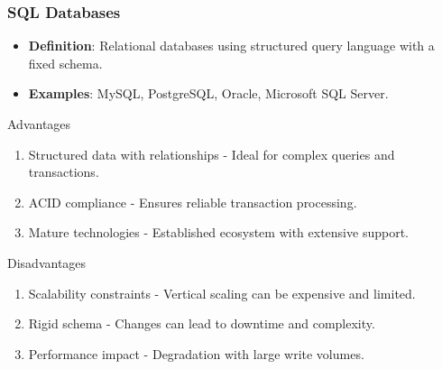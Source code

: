 \documentclass[aspectratio=169]{beamer}
\begin{document}
\begin{frame}[fragile]
    \frametitle{SQL Databases}
    \begin{itemize}
        \item \textbf{Definition}: Relational databases using structured query language with a fixed schema.
        \item \textbf{Examples}: MySQL, PostgreSQL, Oracle, Microsoft SQL Server.
    \end{itemize}

    \begin{block}{Advantages}
        \begin{enumerate}
            \item Structured data with relationships - Ideal for complex queries and transactions.
            \item ACID compliance - Ensures reliable transaction processing.
            \item Mature technologies - Established ecosystem with extensive support.
        \end{enumerate}
    \end{block}

    \begin{block}{Disadvantages}
        \begin{enumerate}
            \item Scalability constraints - Vertical scaling can be expensive and limited.
            \item Rigid schema - Changes can lead to downtime and complexity.
            \item Performance impact - Degradation with large write volumes.
        \end{enumerate}
    \end{block}
\end{frame}
\end{document}
